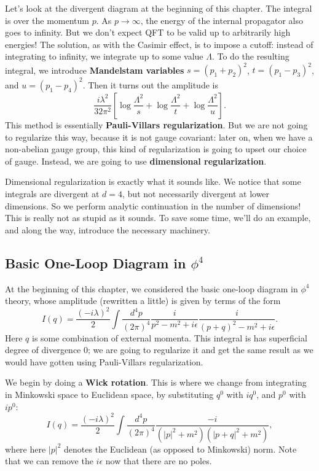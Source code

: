 \documentclass{report}
\theoremstyle{plain}
\theoremstyle{definition}
\theoremstyle{remark}
\begin{document}
Let's look at the divergent diagram at the beginning of this chapter.
The integral is over the momentum $p$. As $p \to \infty$, the energy
of the internal propagator also goes to infinity. But we don't expect
QFT to be valid up to arbitrarily high energies! The solution, as with
the Casimir effect, is to impose a cutoff: instead of integrating to
infinity, we integrate up to some value $\Lambda$. To do the resulting
integral, we introduce {\bf Mandelstam variables} $s = (p_1 + p_2)^2$,
$t = (p_1 - p_3)^2$, and $u = (p_1 - p_4)^2$. Then it turns out the
amplitude is
$$ \frac{i\lambda^2}{32\pi^2}\left[\log\frac{\Lambda^2}{s} + \log\frac{\Lambda^2}{t} + \log\frac{\Lambda^2}{u}\right]. $$
This method is essentially {\bf Pauli-Villars regularization}. But we
are not going to regularize this way, because it is not gauge
covariant: later on, when we have a non-abelian gauge group, this kind
of regularization is going to upset our choice of gauge. Instead, we
are going to use {\bf dimensional regularization}.

Dimensional regularization is exactly what it sounds like. We notice
that some integrals are divergent at $d = 4$, but not necessarily
divergent at lower dimensions. So we perform analytic continuation in
the number of dimensions! This is really not as stupid as it sounds.
To save some time, we'll do an example, and along the way, introduce
the necessary machinery.

\subsection{Basic One-Loop Diagram in $\phi^4$}

At the beginning of this chapter, we considered the basic one-loop
diagram in $\phi^4$ theory, whose amplitude (rewritten a little) is
given by terms of the form
$$ I(q) = \frac{(-i\lambda)^2}{2} \int \frac{d^4p}{(2\pi)^4} \frac{i}{p^2 - m^2 + i\epsilon} \frac{i}{(p+q)^2 - m^2 + i\epsilon}. $$
Here $q$ is some combination of external momenta. This integral is has
superficial degree of divergence $0$; we are going to regularize it
and get the same result as we would have gotten using Pauli-Villars
regularization.

We begin by doing a {\bf Wick rotation}. This is where we change from
integrating in Minkowski space to Euclidean space, by substituting
$q^0$ with $iq^0$, and $p^0$ with $ip^0$:
$$ I(q) = \frac{(-i\lambda)^2}{2} \int \frac{d^4p}{(2\pi)^4} \frac{-i}{(|p|^2 + m^2)(|p + q|^2 + m^2)}, $$
where here $|p|^2$ denotes the Euclidean (as opposed to Minkowski)
norm. Note that we can remove the $i\epsilon$ now that there are no
poles. 
\end{document}
